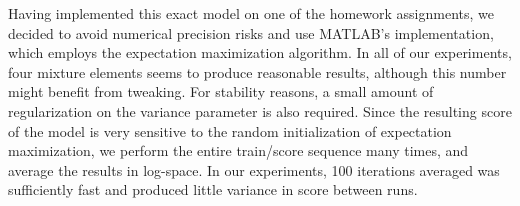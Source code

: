 Having implemented this exact model on one of the homework assignments, we
decided to avoid numerical precision risks and use MATLAB's implementation,
which employs the expectation maximization algorithm.  In all of our
experiments, four mixture elements seems to produce reasonable results,
although this number might benefit from tweaking.  For stability reasons, a
small amount of regularization on the variance parameter is also required.
Since the resulting score of the model is very sensitive to the random
initialization of expectation maximization, we perform the entire train/score
sequence many times, and average the results in log-space.  In our experiments,
100 iterations averaged was sufficiently fast and produced little variance in score
between runs.
